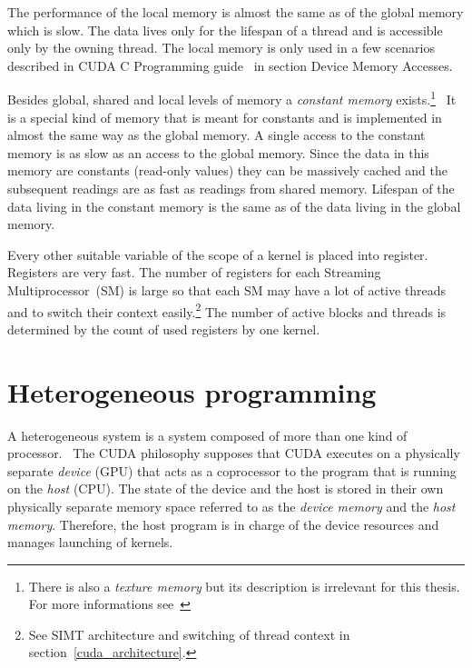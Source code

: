 \documentclass[12pt,oneside]{fithesis2}
\begin{document}
The performance of the local memory is almost the same as of the global memory which is slow. The data lives only for the lifespan of a thread and is accessible only by the owning thread. The local memory is only used in a few scenarios described in CUDA C Programming guide~\cite{cuda_guide} in section Device Memory Accesses.

Besides global, shared and local levels of memory a \emph{constant memory} exists.\footnote{There is also a \emph{texture memory} but its description is irrelevant for this thesis. For more informations see~\cite{cuda_guide}}~\cite{cuda_guide} It is a special kind of memory that is meant for constants and is implemented in almost the same way as the global memory. A single access to the constant memory is as slow as an access to the global memory. Since the data in this memory are constants (read-only values) they can be massively cached and the subsequent readings are as fast as readings from shared memory. Lifespan of the data living in the constant memory is the same as of the data living in the global memory.

Every other suitable variable of the scope of a kernel is placed into register. Registers are very fast. The number of registers for each Streaming Multiprocessor~(SM) is large so that each SM may have a lot of active threads and to switch their context easily.\footnote{See SIMT architecture and switching of thread context in section~\ref{cuda_architecture}.} The number of active blocks and threads is determined by the count of used registers by one kernel.

\section{Heterogeneous programming}
\label{heterogeneous_programming}

A heterogeneous system is a system composed of more than one kind of processor.~\cite{professional_cuda} The CUDA philosophy supposes that CUDA executes on a physically separate \emph{device} (GPU) that acts as a coprocessor to the program that is running on the \emph{host} (CPU). The state of the device and the host is stored in their own physically separate memory space referred to as the \emph{device memory} and the \emph{host memory}. Therefore, the host program is in charge of the device resources and manages launching of kernels.~\cite{cuda_guide}
\end{document}
